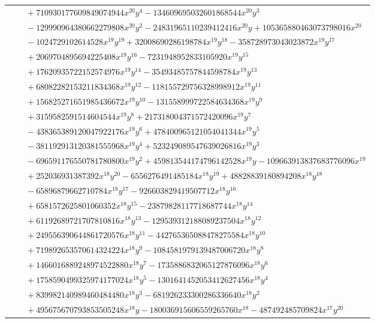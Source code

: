 \documentclass[11pt]{article}
\begin{document}
\begin{longtable}{@{}ll@{}}
 & $\quad +710930177609849074944x^{20}y^{4}-134609695032601868544x^{20}y^{3}$\\
 & $\quad -129990964380662279808x^{20}y^{2}-24831965110239412416x^{20}y+105365880463073798016x^{20}$\\
 & $\quad -1024729102614528x^{19}y^{19}+32008690286198784x^{19}y^{18}-358728973043023872x^{19}y^{17}$\\
 & $\quad +2069704895694225408x^{19}y^{16}-7231948952833105920x^{19}y^{15}$\\
 & $\quad +17620935722152574976x^{19}y^{14}-35493485757844598784x^{19}y^{13}$\\
 & $\quad +68082282153211834368x^{19}y^{12}-118155729756328998912x^{19}y^{11}$\\
 & $\quad +156825271651985436672x^{19}y^{10}-131558999722584634368x^{19}y^{9}$\\
 & $\quad +3159582591514604544x^{19}y^{8}+217318004371572420096x^{19}y^{7}$\\
 & $\quad -438365389120047922176x^{19}y^{6}+478400965121054041344x^{19}y^{5}$\\
 & $\quad -381192913120381555968x^{19}y^{4}+523249089547639026816x^{19}y^{3}$\\
 & $\quad -696591176550781780800x^{19}y^{2}+459813544174796142528x^{19}y-109663913837683776096x^{19}$\\
 & $\quad +252036931387392x^{18}y^{20}-6556276491485184x^{18}y^{19}+48828839180894208x^{18}y^{18}$\\
 & $\quad -65896879662710784x^{18}y^{17}-926603829419507712x^{18}y^{16}$\\
 & $\quad +6581572625801060352x^{18}y^{15}-23879828117718687744x^{18}y^{14}$\\
 & $\quad +61192689721707810816x^{18}y^{13}-129539312188089237504x^{18}y^{12}$\\
 & $\quad +249556390644861720576x^{18}y^{11}-442765365088478275584x^{18}y^{10}$\\
 & $\quad +719892653570614324224x^{18}y^{9}-1084581979139487006720x^{18}y^{8}$\\
 & $\quad +1466016889248974522880x^{18}y^{7}-1735886832065127876096x^{18}y^{6}$\\
 & $\quad +1758590499325974177024x^{18}y^{5}-1301641452053412627456x^{18}y^{4}$\\
 & $\quad +839982140989460484480x^{18}y^{3}-681926233300286336640x^{18}y^{2}$\\
 & $\quad +495675670793853505248x^{18}y-180036915606559265760x^{18}-487492485709824x^{17}y^{20}$\\

\end{longtable}
\end{document}

